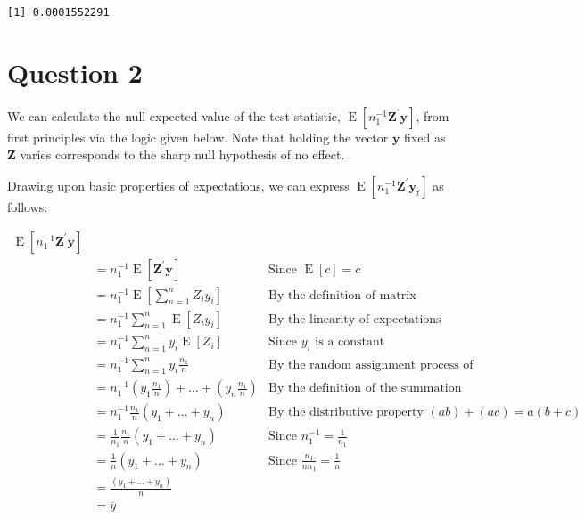 \documentclass[
  12pt,
  leqno]{article}
\DeclareMathOperator{\E}{\mathrm{E}}
\DeclareMathOperator{\1}{\mathbbm{1}}
\begin{document}
\begin{verbatim}
[1] 0.0001552291
\end{verbatim}

\normalsize
\section*{Question 2}

We can calculate the null expected value of the test statistic,
\(\E\left[n_1^{-1} \mathbf{Z}^{\prime}\mathbf{y}\right]\), from first
principles via the logic given below. Note that holding the vector
\(\mathbf{y}\) fixed as \(\mathbf{Z}\) varies corresponds to the sharp
null hypothesis of no effect.

Drawing upon basic properties of expectations, we can express
\(\E\left[n_1^{-1} \mathbf{Z}^{\prime}\mathbf{y}_t\right]\) as follows:

\begin{align*}
\E\left[n_1^{-1} \mathbf{Z}^{\prime}\mathbf{y}\right] \\
& = n_1^{-1} \E\left[\mathbf{Z}^{\prime}\mathbf{y}\right] & \text{Since } \E\left[c\right] = c \\
& = n_1^{-1} \E\left[\sum \limits_{n = 1}^n Z_i y_{i}\right] & \text{By the definition of matrix multiplication} \\
& = n_1^{-1} \sum \limits_{n = 1}^n \E\left[Z_i y_{i}\right] & \text{By the linearity of expectations} \\
& = n_1^{-1} \sum \limits_{n = 1}^n y_{i} \E\left[Z_i\right] & \text{Since } y_{i} \text{ is a constant} \\
& = n_1^{-1} \sum \limits_{n = 1}^n y_{i} \frac{n_1}{n} & \text{By the random assignment process of the experiment} \\
& = n_1^{-1}  \left(y_{1} \frac{n_1}{n}\right) + \dots + \left(y_{n} \frac{n_1}{n}\right) & \text{By the definition of the summation operator} \\
& = n_1^{-1} \frac{n_1}{n} \left(y_{1} + \dots + y_{n}\right) & \text{By the distributive property } (a b) + (a  c) = a(b + c) \\
& = \frac{1}{n_1} \frac{n_1}{n} \left(y_{1} + \dots + y_{n}\right) & \text{Since } n_1^{-1} = \frac{1}{n_1} \\
& = \frac{1}{n} \left(y_{1} + \dots + y_{n}\right) & \text{Since } \frac{n_1}{n n_1} = \frac{1}{n} \\
& = \frac{\left(y_{1} + \dots + y_{n}\right)}{n} \\
& = \overline{y}
\end{align*}
\end{document}
